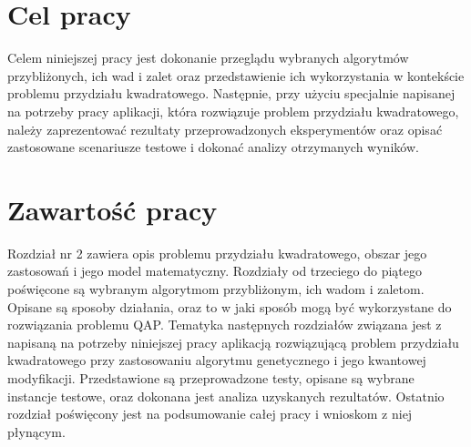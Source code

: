 \section{Cel pracy}
\label{sec:cel}
Celem niniejszej pracy jest dokonanie przeglądu wybranych algorytmów przybliżonych, ich wad i zalet oraz przedstawienie ich wykorzystania w kontekście problemu przydziału kwadratowego. Następnie, przy użyciu specjalnie napisanej na potrzeby pracy aplikacji, która rozwiązuje problem przydziału kwadratowego, należy zaprezentować rezultaty przeprowadzonych eksperymentów oraz opisać zastosowane scenariusze testowe i dokonać analizy otrzymanych wyników.

\section{Zawartość pracy}
\label{sec:zawartosc}
Rozdział nr 2 zawiera opis problemu przydziału kwadratowego, obszar jego zastosowań i jego model matematyczny. Rozdziały od trzeciego do piątego poświęcone są wybranym algorytmom przybliżonym, ich wadom i zaletom. Opisane są sposoby działania, oraz to w jaki sposób mogą być wykorzystane do rozwiązania problemu QAP. Tematyka następnych rozdziałów związana jest z napisaną na potrzeby niniejszej pracy aplikacją rozwiązującą problem przydziału kwadratowego przy zastosowaniu algorytmu genetycznego i jego kwantowej modyfikacji. Przedstawione są przeprowadzone testy, opisane są wybrane instancje testowe, oraz dokonana jest analiza uzyskanych rezultatów. Ostatnio rozdział poświęcony jest na podsumowanie całej pracy i wnioskom z niej płynącym. 
